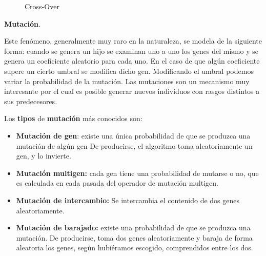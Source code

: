 \documentclass[
  a4paper,
  DIV=11,
  numbers=noendperiod]{scrreprt}
\begin{document}
\begin{figure}
\begin{minipage}{0.33\linewidth}
{}


\end{minipage}%

\caption{\label{fig-crossover}Cross-Over}

\end{figure}%

\textbf{Mutación}.

Este fenómeno, generalmente muy raro en la naturaleza, se modela de la
siguiente forma: cuando se genera un hijo se examinan uno a uno los
genes del mismo y se genera un coeficiente aleatorio para cada uno. En
el caso de que algún coeficiente supere un cierto umbral se modifica
dicho gen. Modificando el umbral podemos variar la probabilidad de la
mutación. Las mutaciones son un mecanismo muy interesante por el cual es
posible generar nuevos individuos con rasgos distintos a sus
predecesores.

Los \textbf{tipos} de \textbf{mutación} más conocidos son:

\begin{itemize}
\item
  \textbf{Mutación de gen}: existe una única probabilidad de que se
  produzca una mutación de algún gen De producirse, el algoritmo toma
  aleatoriamente un gen, y lo invierte.
\item
  \textbf{Mutación multigen:} cada gen tiene una probabilidad de mutarse
  o no, que es calculada en cada pasada del operador de mutación
  multigen.
\item
  \textbf{Mutación de intercambio:} Se intercambia el contenido de dos
  genes aleatoriamente.
\item
  \textbf{Mutación de barajado:} existe una probabilidad de que se
  produzca una mutación. De producirse, toma dos genes aleatoriamente y
  baraja de forma aleatoria los genes, según hubiéramos escogido,
  comprendidos entre los dos.
\end{itemize}
\end{document}
